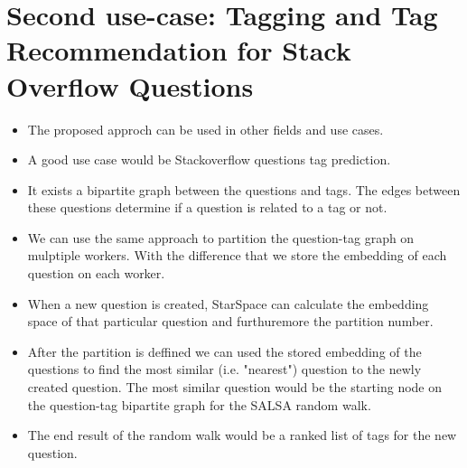 \section{Second use-case: Tagging and Tag Recommendation for Stack Overflow Questions}
\begin{itemize}
    \item The proposed approch can be used in other fields and use cases.
    \item A good use case would be Stackoverflow questions tag prediction.
    \item It exists a bipartite graph between the questions and tags. The edges between these questions determine if a question is related to a tag or not.
    \item We can use the same approach to partition the question-tag graph on mulptiple workers. With the difference that we store the embedding of each question on each worker.
    \item When a new question is created, StarSpace can calculate the embedding space of that particular question and furthuremore the partition number.
    \item After the partition is deffined we can used the stored embedding of the questions to find the most similar (i.e. "nearest") question to the newly created question. The most similar question would be the starting node on the question-tag bipartite graph for the SALSA random walk.
    \item The end result of the random walk would be a ranked list of tags for the new question.
\end{itemize}
